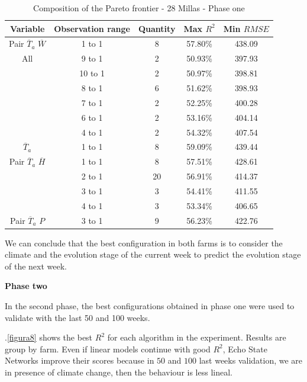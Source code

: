 \documentclass[review,authoryear,english]{elsarticle}
\begin{document}
\begin{table}[h] 
\caption{Composition of the Pareto frontier - 28 Millas - Phase one} 
\label{tabla3} 
\centering
\begin{tabular}{c|c|c|c|c} 
\hline
\bfseries Variable & \bfseries Observation range & \bfseries Quantity & \bfseries Max $R^2$ & \bfseries Min $RMSE$\\ 
\hline\hline 
Pair $\overline{T}_{a}$ $\overline{W}$ & 1 to 1 & 8 & 57.80\% & 438.09 \\
\hline 
All   &	9 to 1 & 2 & 50.93\% & 397.93 \\
  & 10 to 1	 & 2 & 50.97\% & 398.81 \\
  &	8 to 1 & 6 & 51.62\% & 398.93 \\
  &	7 to 1 & 2 & 52.25\% & 400.28 \\
  &	6 to 1 & 2 & 53.16\% & 404.14 \\
  &	4 to 1 & 2 & 54.32\% & 407.54 \\
\hline    
$\overline{T}_{a}$ & 1 to 1  & 8  & 59.09\% & 439.44 \\
\hline
Pair $\overline{T}_{a}$ $\overline{H}$ & 1 to 1	 & 8 & 57.51\% & 428.61 \\
 &	2 to 1 & 20 & 56.91\% & 414.37 \\
 &	3 to 1 & 3 & 54.41\% & 411.55 \\
 &	4 to 1 & 3 & 53.34\% & 406.65 \\
\hline
Pair $\overline{T}_{a}$ $P$ & 3 to 1 & 9 & 56.23\% & 422.76 \\
\hline
\end{tabular} 
\end{table}

We can conclude that the best configuration in both farms is to consider the climate and the evolution stage of the current week to predict the evolution stage of the next week.


{\bf Phase two }

In the second phase, the best configurations obtained in phase one were used to validate with the last 50 and 100 weeks. 


\figurename $.$\ref{figura8} shows the best $R^2$ for each algorithm in the experiment. Results are group by farm. Even if linear models continue with good $R^2$, Echo State Networks improve their scores because in $50$ and $100$ last weeks validation, we are in presence of climate change, then the behaviour is less lineal.
\end{document}
